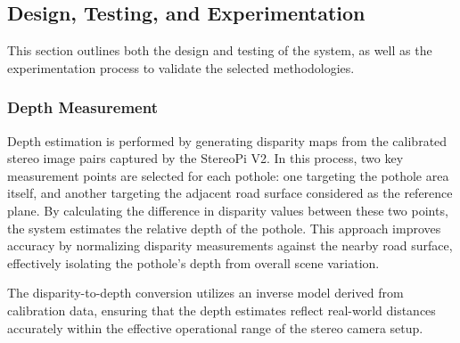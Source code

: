 

\subsection{Design, Testing, and Experimentation}
This section outlines both the design and testing of the system, as well as the experimentation process to validate the selected methodologies. 

\subsubsection{Depth Measurement}
Depth estimation is performed by generating disparity maps from the calibrated stereo image pairs captured by the StereoPi V2. In this process, two key measurement points are selected for each pothole: one targeting the pothole area itself, and another targeting the adjacent road surface considered as the reference plane. By calculating the difference in disparity values between these two points, the system estimates the relative depth of the pothole. This approach improves accuracy by normalizing disparity measurements against the nearby road surface, effectively isolating the pothole’s depth from overall scene variation.

The disparity-to-depth conversion utilizes an inverse model derived from calibration data, ensuring that the depth estimates reflect real-world distances accurately within the effective operational range of the stereo camera setup.

